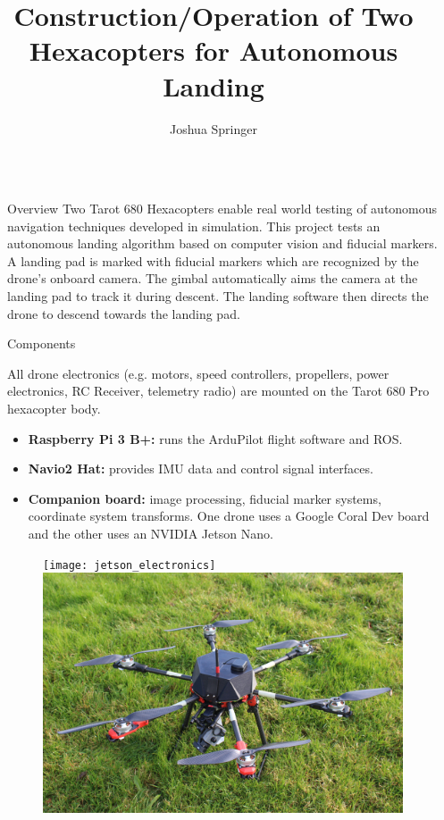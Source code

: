 \documentclass[final, 20pt]{beamer}
\title{Construction/Operation of Two Hexacopters for Autonomous Landing}
\author{Joshua Springer}
\institute[shortinst]{Reykjavík University}
\newlength{\sepwidth}
\newlength{\colwidth}
\newcommand{\separatorcolumn}{\begin{column}{\sepwidth}\end{column}}
\begin{document}
\begin{frame}[t]
\begin{columns}[t]
\separatorcolumn

\begin{column}{\colwidth}

  \begin{block}{Overview}
    Two Tarot 680 Hexacopters enable real world testing of autonomous navigation techniques developed in simulation.
    This project tests an autonomous landing algorithm based on computer vision and fiducial markers.\cite{AL_thesis}
    A landing pad is marked with fiducial markers which are recognized by the drone's onboard camera.
    The gimbal automatically aims the camera at the landing pad to track it during descent.
    The landing software then directs the drone to descend towards the landing pad.
  \end{block}

  \begin{alertblock}{Components}

    All drone electronics (e.g. motors, speed controllers, propellers, power electronics, RC Receiver, telemetry radio) are mounted on the Tarot 680 Pro hexacopter body.

    \begin{itemize}
      \item \textbf{Raspberry Pi 3 B+:} runs the ArduPilot flight software and ROS.
      \item \textbf{Navio2 Hat:} provides IMU data and control signal interfaces.
      \item \textbf{Companion board:} image processing, fiducial marker systems, coordinate system transforms. One drone uses a Google Coral Dev board and the other uses an NVIDIA Jetson Nano.
    \end{itemize}

    \begin{figure}
      \texttt{[image: jetson\_electronics]}
      \includegraphics[width=0.45\linewidth]{jetson_drone.jpg}
    \end{figure}


\end{alertblock}
\end{column}
\end{columns}
\end{frame}
\end{document}
